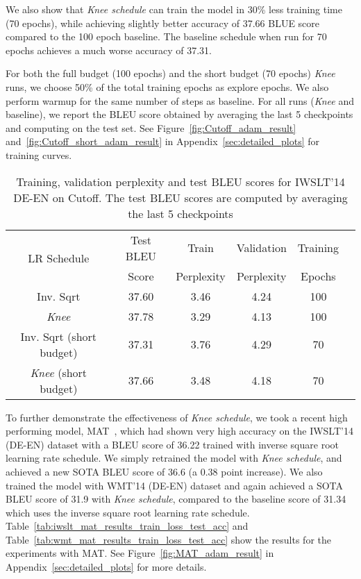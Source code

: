 \documentclass[twoside,11pt]{article}
\newcommand{\lrschedule}{\textit{Knee schedule}}
\newcommand{\lrscheduleshort}{\textit{Knee}}
\begin{document}
We also show that \lrschedule{} can train the model in 30\% less training time (70 epochs), while achieving slightly better accuracy of 37.66 BLUE score compared to the 100 epoch baseline. The baseline schedule when run for 70 epochs achieves a much worse accuracy of 37.31.

For both the full budget (100 epochs) and the short budget (70 epochs) \lrscheduleshort{} runs, we choose 50\% of the total training epochs as explore epochs. We also perform warmup for the same number of steps as baseline. For all runs (\lrscheduleshort{} and baseline), we report the BLEU score obtained by averaging the last 5 checkpoints and computing on the test set. See Figure~\ref{fig:Cutoff_adam_result} and~\ref{fig:Cutoff_short_adam_result} in Appendix~\ref{sec:detailed_plots} for training curves.
 
\begin{table}[h]
\small
\centering
\caption{Training, validation perplexity and test BLEU scores for IWSLT'14 DE-EN on Cutoff. The test BLEU scores are computed by averaging the last 5 checkpoints}
\label{tab:iwslt_cutoff_results_train_loss_test_acc}
{\setlength{\extrarowheight}{1pt}\begin{tabular}{cccccc}
\toprule
  \multirow{2}{*}{LR Schedule} & Test BLEU  & Train & Validation  & Training \\
  &  Score & Perplexity  & Perplexity & Epochs \\ 
 \midrule
Inv. Sqrt  &  37.60   & 3.46  & 4.24  & 100  \\
\lrscheduleshort{}  & 37.78   & 3.29   & 4.13  & 100  \\ 
Inv. Sqrt (short budget)  & 37.31   & 3.76  & 4.29  & 70 \\ 
\lrscheduleshort{} (short budget)  & 37.66   &  3.48  & 4.18  & 70 \\
\bottomrule 
\end{tabular}}
\end{table}




\iffalse
To further demonstrate the effectiveness of \lrschedule{}, we took a recent high performing model, MAT~\citep{mat_fan2020}, which had shown very high accuracy on the IWSLT'14 (DE-EN) dataset with a BLEU score of 36.22 trained with inverse square root learning rate schedule. We simply retrained the model with \lrschedule{}, and achieved a new SOTA BLEU score of 36.6 (a 0.38 point increase). We also trained the model with WMT'14 (DE-EN) dataset and again achieved a SOTA BLEU score of 31.9 with \lrschedule{}, compared to the baseline score of 31.34 which uses the inverse square root learning rate schedule.  Table~\ref{tab:iwslt_mat_results_train_loss_test_acc} and  Table~\ref{tab:wmt_mat_results_train_loss_test_acc} show the results for the experiments with MAT. See Figure~\ref{fig:MAT_adam_result} in Appendix~\ref{sec:detailed_plots} for more details.
\end{document}
